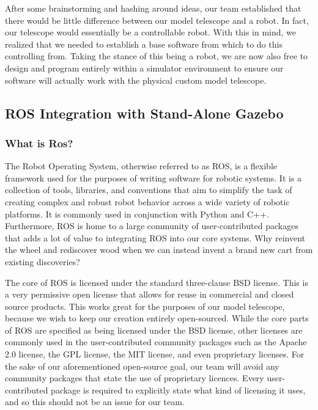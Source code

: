 \documentclass[12pt]{report}
\begin{document}
After some brainstorming and hashing around ideas, our team established that there would be little difference between our model telescope and a robot. In fact, our telescope would essentially be a controllable robot. With this in mind, we realized that we needed to establish a base software from which to do this controlling from. Taking the stance of this being a robot, we are now also free to design and program entirely within a simulator environment to ensure our software will actually work with the physical custom model telescope.  

\subsection*{ROS Integration with Stand-Alone Gazebo}

\subsubsection*{What is Ros?}

The Robot Operating System, otherwise referred to as ROS, is a flexible framework used for the purposes of writing software for robotic systems. It is a collection of tools, libraries, and conventions that aim to simplify the task of creating complex and robust robot behavior across a wide variety of robotic platforms.\cite{ROSDescription} It is commonly used in conjunction with Python and C++. Furthermore, ROS is home to a large community of user-contributed packages that adds a lot of value to integrating ROS into our core systems. Why reinvent the wheel and rediscover wood when we can instead invent a brand new cart from existing discoveries? 

The core of ROS is licensed under the standard three-clause BSD license. This is a very permissive open license that allows for reuse in commercial and closed source products. This works great for the purposes of our model telescope, because we wish to keep our creation entirely open-sourced. While the core parts of ROS are specified as being licensed under the BSD license, other licenses are commonly used in the user-contributed community packages such as the Apache 2.0 license, the GPL license, the MIT license, and even proprietary licenses. For the sake of our aforementioned open-source goal, our team will avoid any community packages that state the use of proprietary licences. Every user-contributed package is required to explicitly state what kind of licensing it uses, and so this should not be an issue for our team. 
\end{document}
